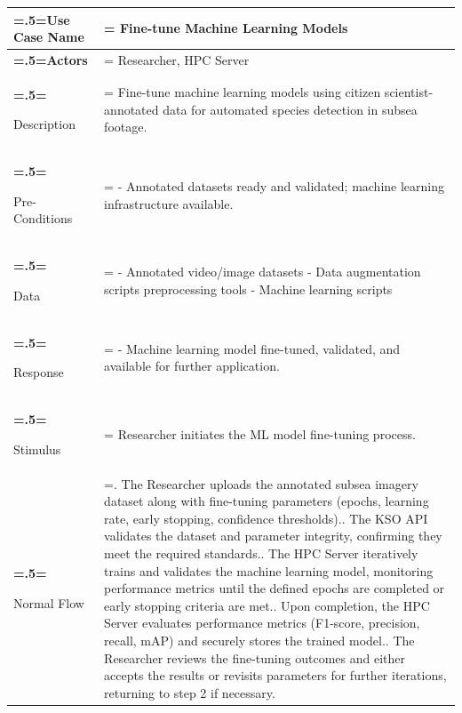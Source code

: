             \begin{table}[H] 
                \centering
                \footnotesize
                \begin{tabularx}{\textwidth}{|>{\bfseries\hsize=.5\hsize\linewidth=\hsize}X|
                >{\hsize=1.5\hsize\linewidth=\hsize}X|}
                \hline
                Use Case Name       & Fine-tune Machine Learning Models \\ \hline
                
                Actors              & Researcher, HPC Server \\ \hline
                
                Description         & 
                Fine-tune machine learning models using citizen scientist-annotated data for automated species detection in subsea footage. \\ \hline
                
                Pre-Conditions      & 
                - Annotated datasets ready and validated; machine learning infrastructure available. \\ \hline
                
                Data                & 
                - Annotated video/image datasets \newline 
                - Data augmentation scripts preprocessing tools \newline
                - Machine learning scripts \\ \hline
                
                Response            & 
                - Machine learning model fine-tuned, validated, and available for further application. \\ \hline
                
                Stimulus            & 
                Researcher initiates the ML model fine-tuning process. \\ \hline
                
                Normal Flow         & 
                1. The Researcher uploads the annotated subsea imagery dataset along with fine-tuning parameters (epochs, learning rate, early stopping, confidence thresholds).\newline
                2. The KSO API validates the dataset and parameter integrity, confirming they meet the required standards.\newline
                3. The HPC Server iteratively trains and validates the machine learning model, monitoring performance metrics until the defined epochs are completed or early stopping criteria are met.\newline
                4. Upon completion, the HPC Server evaluates performance metrics (F1-score, precision, recall, mAP) and securely stores the trained model.\newline
                5. The Researcher reviews the fine-tuning outcomes and either accepts the results or revisits parameters for further iterations, returning to step 2 if necessary.\\ \hline
                

\end{tabularx}
\end{table}
